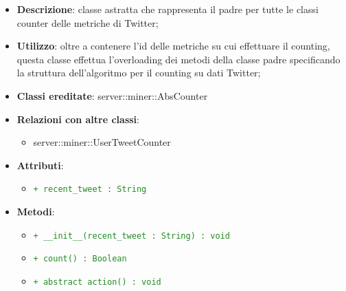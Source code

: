 			\begin{itemize}
				\item \textbf{Descrizione}: classe astratta che rappresenta il padre per tutte le classi counter delle metriche di Twitter;
				\item \textbf{Utilizzo}: oltre a contenere l’id delle metriche su cui effettuare il counting, questa classe effettua l'overloading dei metodi della classe padre specificando la struttura dell'algoritmo per il counting su dati Twitter;
				\item \textbf{Classi ereditate}: server::miner::AbsCounter
				\item \textbf{Relazioni con altre classi}:
					\begin{itemize}
						\item server::miner::UserTweetCounter
					\end{itemize}
				\item \textbf{Attributi}:
					\begin{itemize}
						\item \textcolor{forestgreen}{\texttt{+ recent\_tweet : String}}
					\end{itemize}
				\item \textbf{Metodi}: 
					\begin{itemize}
						\item \textcolor{forestgreen}{\texttt{+ \_\_init\_\_(recent\_tweet : String) : void}}
						\item \textcolor{forestgreen}{\texttt{+ count() : Boolean}}
						\item \textcolor{forestgreen}{\texttt{+ abstract action() : void}}

\end{itemize}
\end{itemize}
